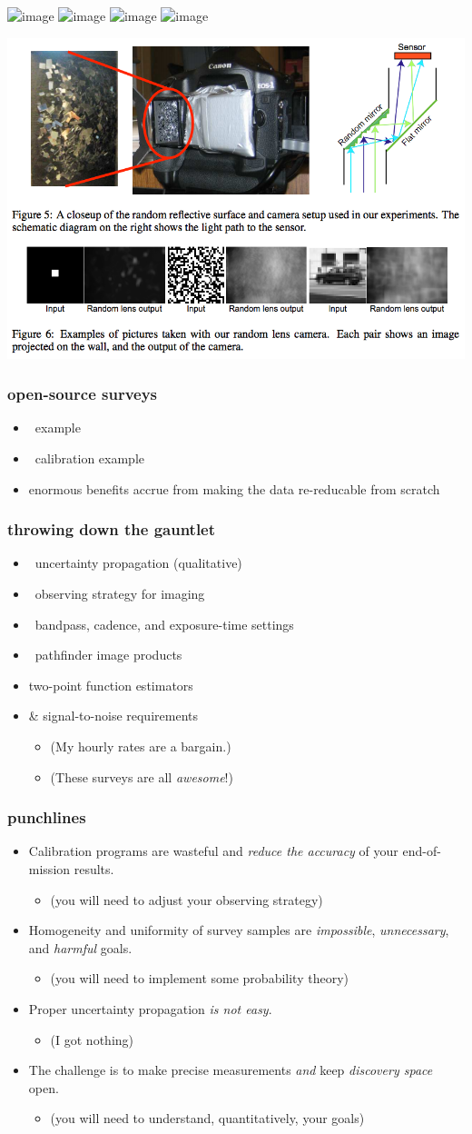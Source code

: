 \documentclass[pdftex]{beamer}
\newcommand{\conclusionslide}{
\begin{frame}
  \frametitle{punchlines}
  \begin{itemize}
  \item Calibration programs are wasteful and \emph{reduce the accuracy} of your end-of-mission results.
    \begin{itemize}
    \item (you will need to adjust your observing strategy)
    \end{itemize}
  \item Homogeneity and uniformity of survey samples are \emph{impossible}, \emph{unnecessary}, and \emph{harmful} goals.
    \begin{itemize}
    \item (you will need to implement some probability theory)
    \end{itemize}
  \item Proper uncertainty propagation \emph{is not easy}.
    \begin{itemize}
    \item (I got nothing)
    \end{itemize}
  \item The challenge is to make precise measurements \emph{and} keep \emph{discovery space} open.
    \begin{itemize}
    \item (you will need to understand, quantitatively, your goals)
    \end{itemize}
  \end{itemize}
\end{frame}
}
\begin{document}
\begin{frame}
  \includegraphics<1>[width=\figurewidth]{p1640data.png}
  \includegraphics<2>[width=\figurewidth]{p1640detections.png}
  \includegraphics<3>[width=\figurewidth]{p1640method.png}
  \includegraphics<4>[width=\figurewidth]{p1640spectra.png}
\end{frame}

\begin{frame}
\includegraphics[width=\textwidth]{fergus.png}
\end{frame}

\begin{frame}
  \frametitle{open-source surveys}
  \begin{itemize}
  \item \hipparcos\ example
  \item \sdss\ calibration example
  \item enormous benefits accrue from making the data re-reducable from scratch
  \end{itemize}
\end{frame}

\begin{frame}
  \frametitle{throwing down the gauntlet}
  \begin{itemize}
  \item \gaia\ uncertainty propagation (qualitative)
  \item \euclid\ observing strategy for imaging
  \item \lsst\ bandpass, cadence, and exposure-time settings
  \item \ska\ pathfinder image products
  \item {} two-point function estimators
  \item {} \&  signal-to-noise requirements
    \begin{itemize}
    \item (My hourly rates are a bargain.)
    \item (These surveys are all \emph{awesome}!)
    \end{itemize}
  \end{itemize}
\end{frame}

\conclusionslide
\end{document}

